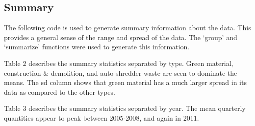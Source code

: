 \documentclass[12pt,]{article}
\newenvironment{Shaded}{\begin{snugshade}}{\end{snugshade}}
\newcommand{\KeywordTok}[1]{\textcolor[rgb]{0.13,0.29,0.53}{\textbf{#1}}}
\newcommand{\DataTypeTok}[1]{\textcolor[rgb]{0.13,0.29,0.53}{#1}}
\newcommand{\StringTok}[1]{\textcolor[rgb]{0.31,0.60,0.02}{#1}}
\newcommand{\CommentTok}[1]{\textcolor[rgb]{0.56,0.35,0.01}{\textit{#1}}}
\newcommand{\OtherTok}[1]{\textcolor[rgb]{0.56,0.35,0.01}{#1}}
\newcommand{\OperatorTok}[1]{\textcolor[rgb]{0.81,0.36,0.00}{\textbf{#1}}}
\newcommand{\NormalTok}[1]{#1}
\begin{document}
\begin{Shaded}
\end{Shaded}

\subsection{Summary}\label{summary}

The following code is used to generate summary information about the
data. This provides a general sense of the range and spread of the data.
The `group' and `summarize' functions were used to generate this
information.

Table 2 describes the summary statistics separated by type. Green
material, construction \& demolition, and auto shredder waste are seen
to dominate the means. The sd column shows that green material has a
much larger spread in its data as compared to the other types.

Table 3 describes the summary statistics separated by year. The mean
quarterly quantities appear to peak between 2005-2008, and again in
2011.
\end{document}
